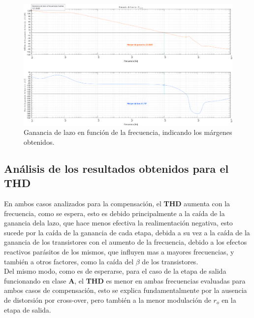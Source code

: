 

\vspace*{\fill}


\clearpage

\begin{figure}[H] %
\begin{center}
\includegraphics[width=0.93 \textheight, angle=90]{./img/simulaciones/Loop/gain_loop_2.png}
\caption{\label{fig:fig_loop_gain_2}\footnotesize{Ganancia de lazo en función de la frecuencia, indicando los márgenes obtenidos.}}
\end{center}
\end{figure}

\clearpage




\subsection{Análisis de los resultados obtenidos para el \textbf{THD}}

En ambos casos analizados para la compensación, el \textbf{THD} aumenta con la frecuencia, como se espera, esto es debido principalmente a la caída de la ganancia dela lazo, que hace menos efectiva la realimentación negativa, esto sucede por la caída de la ganancia de cada etapa, debida a su vez a la caída de la ganancia de los transistores con el aumento de la frecuencia, debido a los efectos reactivos parásitos de los mismos, que influyen mas a mayores frecuencias, y también a otros factores, como la caída del $\beta$ de los transistores. \\

Del mismo modo, como es de esperarse, para el caso de la etapa de salida funcionando en clase \textbf{A}, el \textbf{THD} es menor en ambas frecuencias evaluadas para ambos casos de compensación, esto se explica fundamentalmente por la ausencia de distorsión por cross-over, pero también a la menor modulación de $r_{o}$ en la etapa de salida. \\

